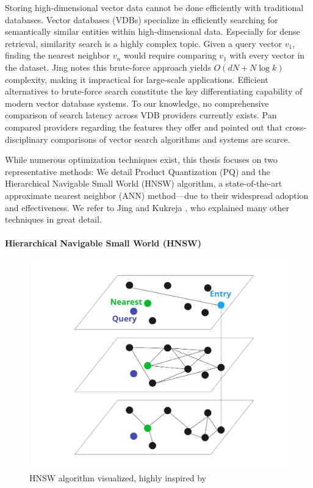 Storing high-dimensional vector data cannot be done efficiently with traditional databases. Vector databases (VDBs) specialize in efficiently searching for semantically similar entities within high-dimensional data. Especially for dense retrieval, similarity search is a highly complex topic. Given a query vector $v_1$, finding the nearest neighbor $v_{n}$ would require comparing $v_1$ with every vector in the dataset. Jing \cite{Jing.2024} notes this brute-force approach yields $O(dN + N \log k)$ complexity, making it impractical for large-scale applications. Efficient alternatives to brute-force search constitute the key differentiating capability of modern vector database systems. To our knowledge, no comprehensive comparison of search latency across VDB providers currently exists. Pan \cite{Pan.2024} compared providers regarding the features they offer and pointed out that cross-disciplinary comparisons of vector search algorithms and systems are scarce.

While numerous optimization techniques exist, this thesis focuses on two representative methods: We detail Product Quantization (PQ) and the Hierarchical Navigable Small World (HNSW) algorithm, a state-of-the-art approximate nearest neighbor (ANN) method—due to their widespread adoption and effectiveness. We refer to Jing \cite{Jing.2024} and Kukreja \cite{Kukreja.2023}, who explained many other techniques in great detail.

\paragraph{Hierarchical Navigable Small World (HNSW)}

\begin{figure}[h!]
    \centering
    \includegraphics[width=\textwidth]{images/HNSW.jpg}
    \caption{HNSW algorithm visualized, highly inspired by \cite{Pinecone.22.01.2025}}
    \label{fig:HNSW}
\end{figure}

